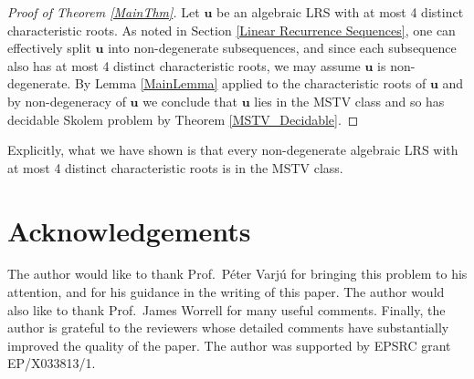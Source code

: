 \documentclass{theoretics}
\newcommand{\LRS}[1]{{\bm{#1}}}
\begin{document}
\begin{proof}[Proof of Theorem \ref{MainThm}]
	Let $\LRS{u}$ be an algebraic LRS with at most 4 distinct characteristic roots. As noted in Section \ref{Linear Recurrence Sequences}, one can effectively split $\LRS{u}$ into non-degenerate subsequences, and since each subsequence also has at most 4 distinct characteristic roots, we may assume $\LRS{u}$ is non-degenerate. By Lemma \ref{MainLemma} applied to the characteristic roots of $\LRS{u}$ and by non-degeneracy of $\LRS{u}$ we conclude that $\LRS{u}$ lies in the MSTV class and so has decidable Skolem problem by Theorem \ref{MSTV_Decidable}.
\end{proof} 
\begin{remark}
Explicitly, what we have shown is that every non-degenerate algebraic LRS with at most 4 distinct characteristic roots is in the MSTV class.
\end{remark}
\section*{Acknowledgements}
    The author would like to thank Prof.\ Péter Varjú for bringing this problem to his attention, and for his guidance in the writing of this paper. The author would also like to thank Prof.\ James Worrell for many useful comments. Finally, the author is grateful to the reviewers whose detailed comments have substantially improved the quality of the paper. The author was supported by EPSRC grant EP/X033813/1.

    \printbibliography
\end{document}
